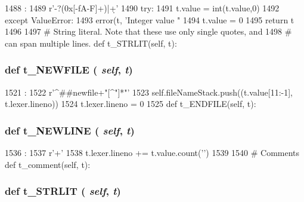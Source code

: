 \begin{DoxyCode}
1488                          :
1489         r'-?(0x[\da-fA-F]+)|\d+'
1490         try:
1491             t.value = int(t.value,0)
1492         except ValueError:
1493             error(t, 'Integer value "%
1494             t.value = 0
1495         return t
1496 
1497     # String literal.  Note that these use only single quotes, and
1498     # can span multiple lines.
    def t_STRLIT(self, t):
\end{DoxyCode}
\hypertarget{classisa__parser_1_1ISAParser_a74a40c060eef7777d3b86c30a17bba90}{
\subsubsection[{t\_\-NEWFILE}]{\setlength{\rightskip}{0pt plus 5cm}def t\_\-NEWFILE ( {\em self}, \/   {\em t})}}
\label{classisa__parser_1_1ISAParser_a74a40c060eef7777d3b86c30a17bba90}



\begin{DoxyCode}
1521                           :
1522         r'^\#\#newfile\s+"[^"]*"'
1523         self.fileNameStack.push((t.value[11:-1], t.lexer.lineno))
1524         t.lexer.lineno = 0
1525 
    def t_ENDFILE(self, t):
\end{DoxyCode}
\hypertarget{classisa__parser_1_1ISAParser_a569a03408bcf75d707d2b8886066e9a3}{
\subsubsection[{t\_\-NEWLINE}]{\setlength{\rightskip}{0pt plus 5cm}def t\_\-NEWLINE ( {\em self}, \/   {\em t})}}
\label{classisa__parser_1_1ISAParser_a569a03408bcf75d707d2b8886066e9a3}



\begin{DoxyCode}
1536                           :
1537         r'\n+'
1538         t.lexer.lineno += t.value.count('\n')
1539 
1540     # Comments
    def t_comment(self, t):
\end{DoxyCode}
\hypertarget{classisa__parser_1_1ISAParser_af152d0eadd5e6f041614468a98132120}{
\subsubsection[{t\_\-STRLIT}]{\setlength{\rightskip}{0pt plus 5cm}def t\_\-STRLIT ( {\em self}, \/   {\em t})}}
\label{classisa__parser_1_1ISAParser_af152d0eadd5e6f041614468a98132120}



